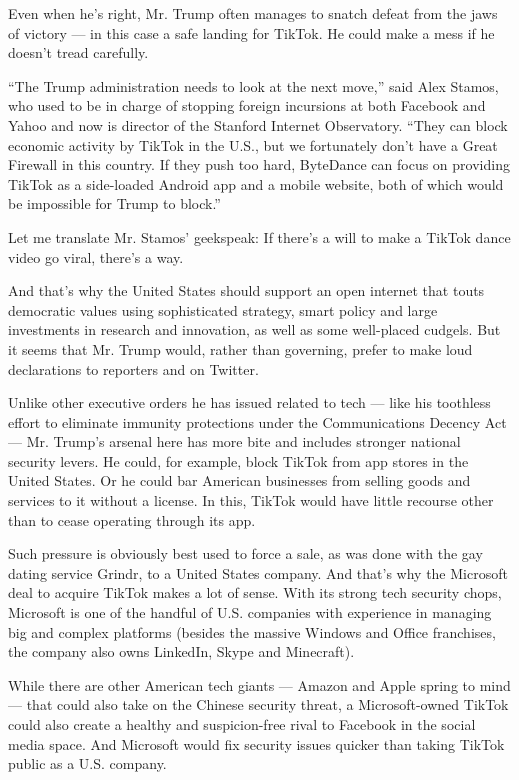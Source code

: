 Even when he's right, Mr. Trump often manages to snatch defeat from the
jaws of victory --- in this case a safe landing for TikTok. He could
make a mess if he doesn't tread carefully.

``The Trump administration needs to look at the next move,'' said Alex
Stamos, who used to be in charge of stopping foreign incursions at both
Facebook and Yahoo and now is director of the Stanford Internet
Observatory. ``They can block economic activity by TikTok in the U.S.,
but we fortunately don't have a Great Firewall in this country. If they
push too hard, ByteDance can focus on providing TikTok as a side-loaded
Android app and a mobile website, both of which would be impossible for
Trump to block.''

Let me translate Mr. Stamos' geekspeak: If there's a will to make a
TikTok dance video go viral, there's a way.

And that's why the United States should support an open internet that
touts democratic values using sophisticated strategy, smart policy and
large investments in research and innovation, as well as some
well-placed cudgels. But it seems that Mr. Trump would, rather than
governing, prefer to make loud declarations to reporters and on Twitter.

Unlike other executive orders he has issued related to tech --- like his
toothless effort to eliminate immunity protections under the
Communications Decency Act --- Mr. Trump's arsenal here has more bite
and includes stronger national security levers. He could, for example,
block TikTok from app stores in the United States. Or he could bar
American businesses from selling goods and services to it without a
license. In this, TikTok would have little recourse other than to cease
operating through its app.

Such pressure is obviously best used to force a sale, as was done with
the gay dating service Grindr, to a United States company. And that's
why the Microsoft deal to acquire TikTok makes a lot of sense. With its
strong tech security chops, Microsoft is one of the handful of U.S.
companies with experience in managing big and complex platforms (besides
the massive Windows and Office franchises, the company also owns
LinkedIn, Skype and Minecraft).

While there are other American tech giants --- Amazon and Apple spring
to mind --- that could also take on the Chinese security threat, a
Microsoft-owned TikTok could also create a healthy and suspicion-free
rival to Facebook in the social media space. And Microsoft would fix
security issues quicker than taking TikTok public as a U.S. company.

